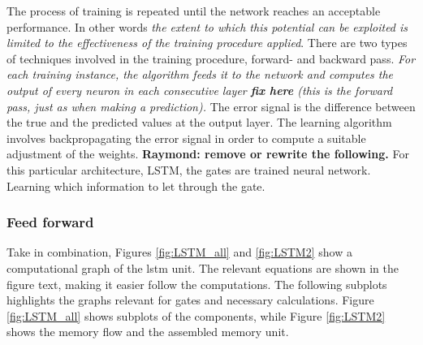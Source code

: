 The process of training is repeated until the network reaches an acceptable performance. In other words \textit{the extent to which this potential can be exploited is limited to the effectiveness of the training procedure applied}. There are two types of techniques involved in the training procedure, forward- and backward pass. \textit{For each training instance, the algorithm feeds it to the network and computes the output of every neuron in each consecutive layer \textbf{fix here} (this is the forward pass, just as when making a prediction).} 
The error signal is the difference between the true and the predicted values at the output layer. The learning algorithm involves backpropagating the error signal in order to compute a suitable adjustment of the weights. \textbf{Raymond: remove or rewrite the following.} For this particular architecture, LSTM, the gates are trained neural network. Learning which information to let through the gate.


\subsubsection{Feed forward} \label{sec:forward_pass_lstm}


Take in combination, Figures \ref{fig:LSTM_all} and \ref{fig:LSTM2} show a computational graph of the \acrshort{lstm} unit. The relevant equations are shown in the figure text, making it easier follow the computations. The following subplots highlights the graphs relevant for gates and necessary calculations. Figure \ref{fig:LSTM_all} shows subplots of the components, while Figure \ref{fig:LSTM2} shows the memory flow and the assembled memory unit.

